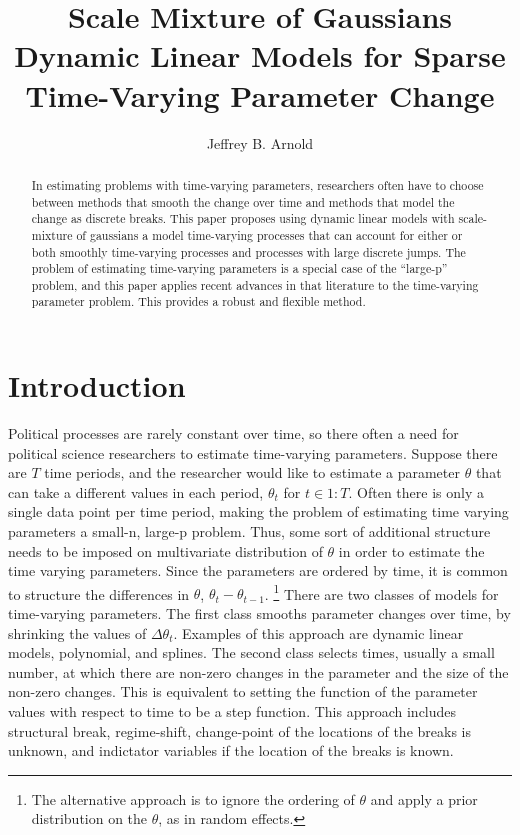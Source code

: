 \documentclass{article}
\author{Jeffrey B. Arnold}
\title{Scale Mixture of Gaussians Dynamic Linear Models for Sparse 
  Time-Varying Parameter Change}
\begin{document}
\maketitle{}

\begin{abstract}
  In estimating problems with time-varying parameters, researchers often have to choose between methods that smooth the change over time and methods that model the change as discrete breaks.
  This paper proposes using dynamic linear models with scale-mixture of gaussians a model time-varying processes that can account for either or both smoothly time-varying processes and processes with large discrete jumps.
  The problem of estimating time-varying parameters is a special case of the ``large-p'' problem, and this paper applies recent advances in that literature to the time-varying parameter problem.
  This provides a robust and flexible method. 
\end{abstract}

\section{Introduction}
\label{sec:introduction}

Political processes are rarely constant over time, so there often a need for political science researchers to estimate time-varying parameters.
Suppose there are $T$ time periods, and the researcher would like to estimate a parameter $\theta$ that can take a different values in each period, $\theta_{t}$ for $t \in 1:T$.
Often there is only a single data point per time period, making the problem of estimating time varying parameters a small-n, large-p problem. 
Thus, some sort of additional structure needs to be imposed on multivariate distribution of $\theta$ in order to estimate the time varying parameters.%
Since the parameters are ordered by time, it is common to structure the differences in $\theta$, $\theta_{t} - \theta_{t - 1}$.
\footnote{The alternative approach is to ignore the ordering of $\theta$ and apply a prior distribution on the $\theta$, as in random effects.}
There are two classes of models for time-varying parameters.
The first class smooths parameter changes over time, by shrinking the values of $\Delta \theta_{t}$.
Examples of this approach are dynamic linear models, polynomial, and splines.
The second class selects times, usually a small number, at which there are non-zero changes in the parameter and the size of the non-zero changes.
This is equivalent to setting the function of the parameter values with respect to time to be a step function.
This approach includes structural break, regime-shift, change-point of the locations of the breaks is unknown, and indictator variables if the location of the breaks is known.
\end{document}
